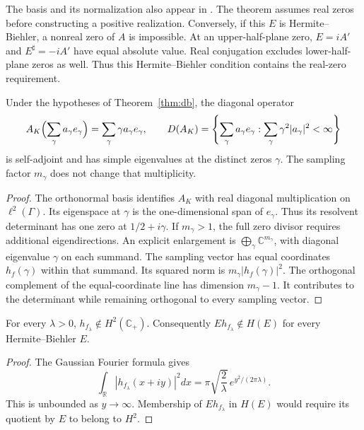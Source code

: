 \documentclass[11pt]{article}
\begin{document}
The basis and its normalization also appear in
\cite[Eq.~(3.5), Proposition~4.1]{suzuki}.
The theorem assumes real zeros before constructing a positive realization.
Conversely, if this $E$ is Hermite--Biehler, a nonreal zero of $A$ is impossible.
At an upper-half-plane zero, $E=iA'$ and $E^\sharp=-iA'$ have equal absolute value.
Real conjugation excludes lower-half-plane zeros as well.
Thus this Hermite--Biehler condition contains the real-zero requirement.

\begin{proposition}\label{prop:multiplicity}
Under the hypotheses of Theorem~\ref{thm:db}, the diagonal operator
\[
 A_K\Bigl(\sum_\gamma a_\gamma e_\gamma\Bigr)
       =\sum_\gamma\gamma a_\gamma e_\gamma,\qquad
 D(A_K)=\left\{\sum_\gamma a_\gamma e_\gamma:
                \sum_\gamma\gamma^2|a_\gamma|^2<\infty\right\}
\]
is self-adjoint and has simple eigenvalues at the distinct zeros $\gamma$.
The sampling factor $m_\gamma$ does not change that multiplicity.
\end{proposition}
\begin{proof}
The orthonormal basis identifies $A_K$ with real diagonal multiplication on $\ell^2(\Gamma)$.
Its eigenspace at $\gamma$ is the one-dimensional span of $e_\gamma$.
Thus its resolvent determinant has one zero at $1/2+i\gamma$.
If $m_\gamma>1$, the full zero divisor requires additional eigendirections.
An explicit enlargement is $\bigoplus_\gamma\mathbb C^{m_\gamma}$,
with diagonal eigenvalue $\gamma$ on each summand.
The sampling vector has equal coordinates $h_f(\gamma)$ within that summand.
Its squared norm is $m_\gamma|h_f(\gamma)|^2$.
The orthogonal complement of the equal-coordinate line has dimension $m_\gamma-1$.
It contributes to the determinant while remaining orthogonal to every sampling vector.
\end{proof}

\begin{proposition}\label{prop:hardy}
For every $\lambda>0$, $h_{f_\lambda}\notin H^2(\mathbb C_+)$.
Consequently $E h_{f_\lambda}\notin H(E)$ for every Hermite--Biehler $E$.
\end{proposition}
\begin{proof}
The Gaussian Fourier formula gives
\[
 \int_{\mathbb R}|h_{f_\lambda}(x+iy)|^2dx
    =\pi\sqrt{\frac2\lambda}\,e^{y^2/(2\pi\lambda)}.
\]
This is unbounded as $y\to\infty$.
Membership of $E h_{f_\lambda}$ in $H(E)$ would require its quotient by $E$ to belong to $H^2$.
\end{proof}
\end{document}
